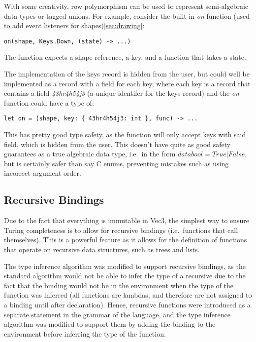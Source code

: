 With some creativity, row polymorphism can be used to represent semi-algebraic data types or tagged unions.
For example, consider the built-in \textit{on} function (used to add event listeners for shapes)\ref{sec:drawing}:

\begin{verbatim}
on(shape, Keys.Down, (state) -> ...)
\end{verbatim}

The function expects a shape reference, a key, and a function that takes a state.

The implementation of the keys record is hidden from the user, but could well be implemented as a record with a field
for each key, where each key is a record that contains a field 
\textit{43hr4h54j3} (a unique identifer for the keys record) and the \textit{on} function could have a type of:
\begin{verbatim}
let on = (shape, key: { 43hr4h54j3: int }, func) -> ...
\end{verbatim}

This has pretty good type safety, as the function will only accept keys with said field, which is hidden from the user.
This doesn't have quite as good safety guarantees as a true algebraic data type, i.e.\ in the form 
$data bool = True | False$, but is certainly safer than say C enums, preventing mistakes such as using incorrect 
argument order.

\subsection{Recursive Bindings}\label{subsec:recursive-bindings}

Due to the fact that everything is immutable in Vec3, the simplest way to ensure Turing completeness is to allow for 
recursive bindings (i.e.\ functions that call themselves).
This is a powerful feature as it allows for the definition of functions that operate on recursive data structures, such
as trees and lists.

The type inference algorithm was modified to support recursive bindings, as the standard algorithm would not be able to
infer the type of a recursive due to the fact that the binding would not be in the environment when the type of the
function was inferred (all functions are lambdas, and therefore are not assigned to a binding until after declaration).
Hence, recursive functions were introduced as a separate statement in the grammar of the language, and the type
inference algorithm was modified to support them by adding the binding to the environment before inferring the type of
the function.

